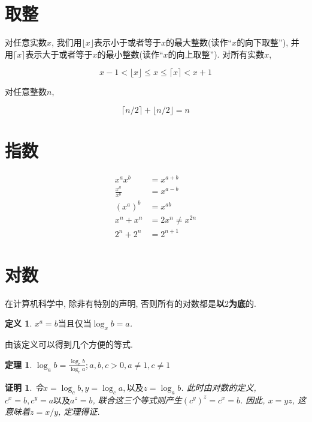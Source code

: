 \documentclass[oneside,10pt,fontset=none]{ctexbook}
\newtheorem{definition}{定义}
\numberwithin{definition}{chapter}
\newtheorem{theorem}{定理}
\numberwithin{theorem}{chapter}
\numberwithin{lemma}{chapter}
\newtheorem*{myproof}{证明}
\begin{document}
\section{取整}

对任意实数$x$, 我们用$\lfloor{x}\rfloor$表示小于或者等于$x$的最大整数(读作``$x$的向下取整''), 并用$\lceil{x}\rceil$表示大于或者等于$x$的最小整数(读作``$x$的向上取整''). 对所有实数$x$,

\begin{equation}
    x - 1 < \lfloor{x}\rfloor \leq x \leq \lceil{x}\rceil < x + 1
\end{equation}

对任意整数$n$,

\begin{equation*}
    \lceil{n/2}\rceil + \lfloor{n/2}\rfloor = n
\end{equation*}

\section{指数}

\begin{equation*}
    \begin{split}
        x^ax^b &= x^{a+b} \\
        \frac{x^a}{x^b} &= x^{a-b} \\
        (x^a)^b &= x^{ab} \\
        x^n+x^n &= 2x^n \ne x^{2n} \\
        2^n+2^n &= 2^{n+1}
    \end{split}
\end{equation*}

\section{对数}

在计算机科学中, 除非有特别的声明, 否则所有的对数都是\textbf{以$2$为底}的.

\begin{definition}
    $x^a=b\text{当且仅当}\log_xb=a$.
\end{definition}

由该定义可以得到几个方便的等式.

\begin{theorem}
    $\log_ab = \frac{\log_cb}{\log_ca}; a,b,c > 0, a\ne 1, c\ne 1$
\end{theorem}

\begin{myproof}
    令$x=\log_c{b},y=\log_c{a},\text{以及}z=\log_ab$. 此时由对数的定义, $c^x=b,c^y=a\text{以及}a^z=b$, 联合这三个等式则产生$(c^y)^z=c^x=b$. 因此, $x=yz$, 这意味着$z=x/y$, 定理得证.
\end{myproof}
\end{document}
